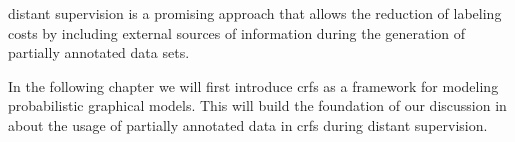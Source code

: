 \Gls{distant supervision} is a promising approach that allows the reduction of labeling costs by including external sources of information during the generation of partially annotated data sets.



In the following chapter we will first introduce \glspl{crf} as a framework for modeling \glspl{probabilistic graphical model}.
This will build the foundation of our discussion in  about the usage of partially annotated data in \glspl{crf} during \gls{distant supervision}.

